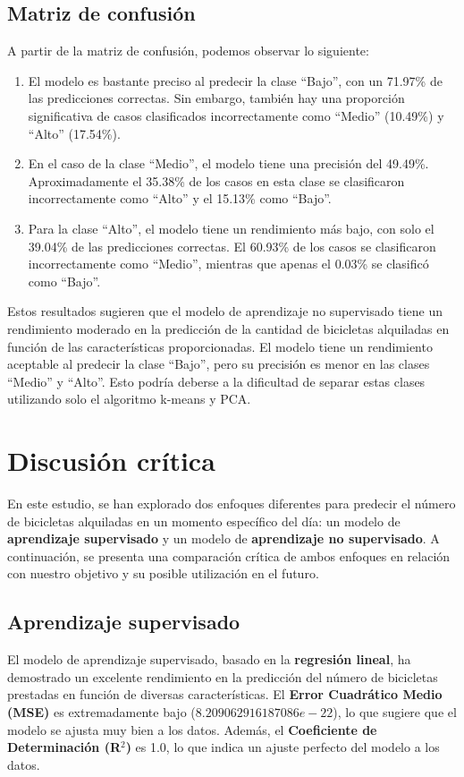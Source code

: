 \documentclass{wsdcr}
\begin{document}
\subsection{Matriz de confusión}
A partir de la matriz de confusión, podemos observar lo siguiente:
\begin{enumerate}
    \item El modelo es bastante preciso al predecir la clase ``Bajo'', con un 71.97\% de las predicciones correctas. Sin embargo, también hay una proporción significativa de casos clasificados incorrectamente como ``Medio'' (10.49\%) y ``Alto'' (17.54\%).
    \item En el caso de la clase ``Medio'', el modelo tiene una precisión del 49.49\%. Aproximadamente el 35.38\% de los casos en esta clase se clasificaron incorrectamente como ``Alto'' y el 15.13\% como ``Bajo''.
    \item Para la clase ``Alto'', el modelo tiene un rendimiento más bajo, con solo el 39.04\% de las predicciones correctas. El 60.93\% de los casos se clasificaron incorrectamente como ``Medio'', mientras que apenas el 0.03\% se clasificó como ``Bajo''.
\end{enumerate}
Estos resultados sugieren que el modelo de aprendizaje no supervisado tiene un rendimiento moderado en la predicción de la cantidad de bicicletas alquiladas en función de las características proporcionadas. El modelo tiene un rendimiento aceptable al predecir la clase ``Bajo'', pero su precisión es menor en las clases ``Medio'' y ``Alto''. Esto podría deberse a la dificultad de separar estas clases utilizando solo el algoritmo k-means y PCA.

\section{Discusión crítica}

En este estudio, se han explorado dos enfoques diferentes para predecir el número de bicicletas alquiladas en un momento específico del día: un modelo de \textbf{aprendizaje supervisado} y un modelo de \textbf{aprendizaje no supervisado}. A continuación, se presenta una comparación crítica de ambos enfoques en relación con nuestro objetivo y su posible utilización en el futuro.

\subsection{Aprendizaje supervisado}

El modelo de aprendizaje supervisado, basado en la \textbf{regresión lineal}, ha demostrado un excelente rendimiento en la predicción del número de bicicletas prestadas en función de diversas características. El \textbf{Error Cuadrático Medio (MSE)} es extremadamente bajo ($8.209062916187086e-22$), lo que sugiere que el modelo se ajusta muy bien a los datos. Además, el \textbf{Coeficiente de Determinación (R$^2$)} es 1.0, lo que indica un ajuste perfecto del modelo a los datos.
\end{document}
